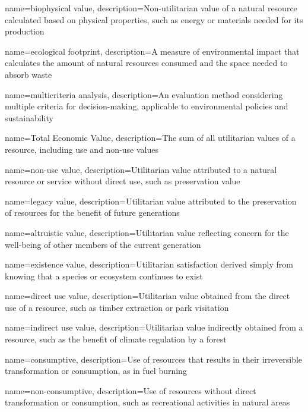 {
	name=biophysical value,
	description={Non-utilitarian value of a natural resource calculated based on physical properties, such as energy or materials needed for its production}
}

{
	name=ecological footprint,
	description={A measure of environmental impact that calculates the amount of natural resources consumed and the space needed to absorb waste}
}

{
	name=multicriteria analysis,
	description={An evaluation method considering multiple criteria for decision-making, applicable to environmental policies and sustainability}
}

{
	name=Total Economic Value,
	description={The sum of all utilitarian values of a resource, including use and non-use values}
}

{
	name=non-use value,
	description={Utilitarian value attributed to a natural resource or service without direct use, such as preservation value}
}

{
	name=legacy value,
	description={Utilitarian value attributed to the preservation of resources for the benefit of future generations}
}

{
	name=altruistic value,
	description={Utilitarian value reflecting concern for the well-being of other members of the current generation}
}

{
	name=existence value,
	description={Utilitarian satisfaction derived simply from knowing that a species or ecosystem continues to exist}
}

{
	name=direct use value,
	description={Utilitarian value obtained from the direct use of a resource, such as timber extraction or park visitation}
}

{
	name=indirect use value,
	description={Utilitarian value indirectly obtained from a resource, such as the benefit of climate regulation by a forest}
}

{
	name=consumptive,
	description={Use of resources that results in their irreversible transformation or consumption, as in fuel burning}
}

{
	name=non-consumptive,
	description={Use of resources without direct transformation or consumption, such as recreational activities in natural areas}
}

